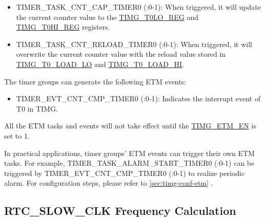 \documentclass[main\_\_EN.tex]{subfiles}
\begin{document}
\begin{itemize}
\begin{tiplisting}
\begin{enumerate}
    \item TIMER\_TASK\_ALARM\_START\_TIMER0: When triggered, it will enable the alarm generation;
    \item Alarm events: When triggered, it will disable the alarm generation;
    \item APB configuration \hyperref[fielddesc:TIMGTXALARMEN]{TIMG\_T0\_ALARM\_EN}: When triggered, it will enable or disable the alarm generation.
\end{enumerate}
\end{tiplisting}

\item TIMER\_TASK\_CNT\_CAP\_TIMER0 (:0-1): When triggered, it will update the current counter value to the \hyperref[regdesc:TIMGTXLOREG]{TIMG\_T0LO\_REG} and \hyperref[regdesc:TIMGTXHIREG]{TIMG\_T0HI\_REG} registers.
\item TIMER\_TASK\_CNT\_RELOAD\_TIMER0 (:0-1): When triggered, it will overwrite the current counter value with the reload value stored in \hyperref[fielddesc:TIMGTXLOADLO]{TIMG\_T0\_LOAD\_LO} and \hyperref[fielddesc:TIMGTXLOADHI]{TIMG\_T0\_LOAD\_HI}.
\end{itemize}

The timer groups can generate the following ETM events:

\begin{itemize}
\item TIMER\_EVT\_CNT\_CMP\_TIMER0 (:0-1): Indicates the interrupt event of T0 in TIMG.
\end{itemize}

All the ETM tasks and events will not take effect until the \hyperref[fielddesc:TIMGETMEN]{TIMG\_ETM\_EN} is set to 1.

In practical applications, timer groups' ETM events can trigger their own ETM tasks. For example, TIMER\_TASK\_ALARM\_START\_TIMER0 (:0-1) can be triggered by TIMER\_EVT\_CNT\_CMP\_TIMER0 (:0-1) to realize periodic alarm. For configuration steps, please refer to \ref{sec:timg-conf-etm} .

\subsection{RTC\_SLOW\_CLK Frequency Calculation}\label{sec:rtc-calibration-desc}
\end{document}
